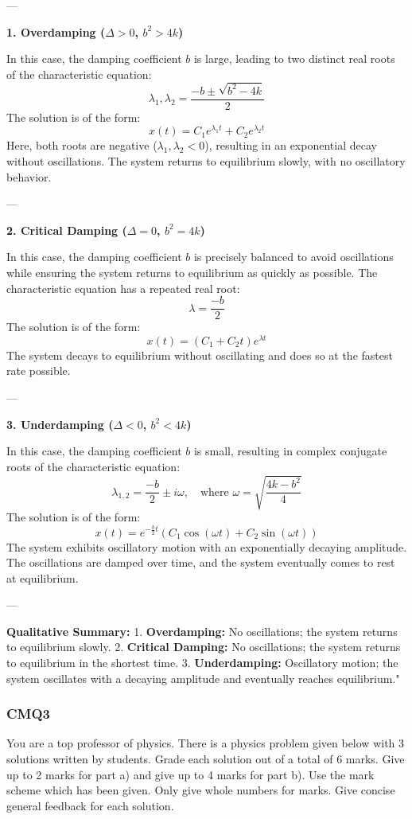 ---

\textbf{1. Overdamping (\(\Delta > 0\), \(b^2 > 4k\))}

In this case, the damping coefficient \(b\) is large, leading to two distinct real roots of the characteristic equation:
\[
\lambda_1, \lambda_2 = \frac{-b \pm \sqrt{b^2 - 4k}}{2}
\]
The solution is of the form:
\[
x(t) = C_1 e^{\lambda_1 t} + C_2 e^{\lambda_2 t}
\]
Here, both roots are negative (\(\lambda_1, \lambda_2 < 0\)), resulting in an exponential decay without oscillations. The system returns to equilibrium slowly, with no oscillatory behavior.

---

\textbf{2. Critical Damping (\(\Delta = 0\), \(b^2 = 4k\))}

In this case, the damping coefficient \(b\) is precisely balanced to avoid oscillations while ensuring the system returns to equilibrium as quickly as possible. The characteristic equation has a repeated real root:
\[
\lambda = \frac{-b}{2}
\]
The solution is of the form:
\[
x(t) = (C_1 + C_2 t) e^{\lambda t}
\]
The system decays to equilibrium without oscillating and does so at the fastest rate possible.

---

\textbf{3. Underdamping (\(\Delta < 0\), \(b^2 < 4k\))}

In this case, the damping coefficient \(b\) is small, resulting in complex conjugate roots of the characteristic equation:
\[
\lambda_{1,2} = \frac{-b}{2} \pm i \omega, \quad \text{where } \omega = \sqrt{\frac{4k - b^2}{4}}
\]
The solution is of the form:
\[
x(t) = e^{-\frac{b}{2}t} \left(C_1 \cos(\omega t) + C_2 \sin(\omega t)\right)
\]
The system exhibits oscillatory motion with an exponentially decaying amplitude. The oscillations are damped over time, and the system eventually comes to rest at equilibrium.

---

\textbf{Qualitative Summary:}
1. \textbf{Overdamping:} No oscillations; the system returns to equilibrium slowly.
2. \textbf{Critical Damping:} No oscillations; the system returns to equilibrium in the shortest time.
3. \textbf{Underdamping:} Oscillatory motion; the system oscillates with a decaying amplitude and eventually reaches equilibrium."


\subsubsection{CMQ3}

You are a top professor of physics. There is a physics problem given below with 3 solutions written by students. Grade each solution out of a total of 6 marks. Give up to 2 marks for part a) and give up to 4 marks for part b). Use the mark scheme which has been given. Only give whole numbers for marks. Give concise general feedback for each solution.

